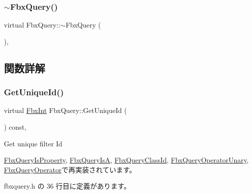 \subsubsection{\texorpdfstring{$\sim$\+Fbx\+Query()}{~FbxQuery()}}
{\footnotesize\ttfamily virtual Fbx\+Query\+::$\sim$\+Fbx\+Query (\begin{DoxyParamCaption}{ }\end{DoxyParamCaption})\hspace{0.3cm}{\ttfamily [protected]}, {\ttfamily [virtual]}}



\subsection{関数詳解}
\mbox{\label{class_fbx_query_ac7daae8f6fa83cd97ae24e93d7b4dc29}} 
\subsubsection{\texorpdfstring{Get\+Unique\+Id()}{GetUniqueId()}}
{\footnotesize\ttfamily virtual \hyperlink{fbxtypes_8h_a088fa96de3b0b3ea69f0f6afef525dfb}{Fbx\+Int} Fbx\+Query\+::\+Get\+Unique\+Id (\begin{DoxyParamCaption}{ }\end{DoxyParamCaption}) const\hspace{0.3cm}{\ttfamily [inline]}, {\ttfamily [virtual]}}



Get unique filter Id 



\hyperlink{class_fbx_query_is_property_a390fb64587424e7d16cb4966566aee80}{Fbx\+Query\+Is\+Property}, \hyperlink{class_fbx_query_is_a_acf42ad6bd28bf6543ab09642561ee73b}{Fbx\+Query\+IsA}, \hyperlink{class_fbx_query_class_id_a9460258f2525b83b7e81f87a3bcc2c61}{Fbx\+Query\+Class\+Id}, \hyperlink{class_fbx_query_operator_unary_ac2e7dbfc697aee51db49db2857ab2b7c}{Fbx\+Query\+Operator\+Unary}, \hyperlink{class_fbx_query_operator_a55d021e0103b5e7dc0f8a80e4b468314}{Fbx\+Query\+Operator}で再実装されています。



 fbxquery.\+h の 36 行目に定義があります。

\mbox{\label{class_fbx_query_adfc24c7306ceed2fcfd8c67198e0c1dd}} 
